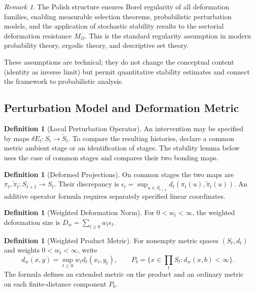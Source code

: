 \documentclass[11pt,a4paper]{article}
\theoremstyle{plain}
\theoremstyle{definition}
\newtheorem{definition}[theorem]{Definition}
\theoremstyle{remark}
\newtheorem{remark}[theorem]{Remark}
\begin{document}
\begin{remark}
The Polish structure ensures Borel regularity of all deformation families, enabling measurable selection theorems, probabilistic perturbation models, and the application of stochastic stability results to the sectorial deformation resistance $M_\Omega$. This is the standard regularity assumption in modern probability theory, ergodic theory, and descriptive set theory.
\end{remark}

These assumptions are technical; they do not change the conceptual content (identity as inverse limit) but permit quantitative stability estimates and connect the framework to probabilistic analysis.

\subsection{Perturbation Model and Deformation Metric}

\begin{definition}[Local Perturbation Operator]
An intervention may be specified by maps $\delta E_t:S_t\to\widetilde S_t$. To compare the resulting histories, declare a common metric ambient stage or an identification of stages. The stability lemma below uses the case of common stages and compares their two bonding maps.
\end{definition}

\begin{definition}[Deformed Projections]
On common stages the two maps are $\pi_t,\widetilde\pi_t:S_{t+1}\to S_t$. Their discrepancy is $\epsilon_t=\sup_{u\in S_{t+1}}d_t(\pi_t(u),\widetilde\pi_t(u))$. An additive operator formula requires separately specified linear coordinates.
\end{definition}

\begin{definition}[Weighted Deformation Norm]
For $0<w_t<\infty$, the weighted deformation size is $D_w=\sum_{t\geq0} w_t\epsilon_t$.
\end{definition}

\begin{definition}[Weighted Product Metric]\label{def:weighted-sup-metric}
For nonempty metric spaces $(S_t,d_t)$ and weights $0<w_t<\infty$, write
\[
 d_w(x,y)=\sup_{t\geq0} w_t d_t(x_t,y_t),\qquad
 P_b=\{x\in\textstyle\prod_t S_t:d_w(x,b)<\infty\}.
\]
The formula defines an extended metric on the product and an ordinary metric on each finite-distance component $P_b$.
\end{definition}
\end{document}
